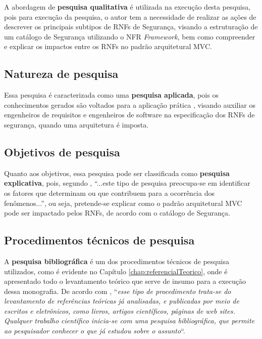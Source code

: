 A abordagem de \textbf{pesquisa qualitativa} é utilizada na execução desta pesquisa, pois para execução da pesquisa, o autor tem a necessidade de realizar as ações de descrever os principais subtipos de RNFs de Segurança, visando a estruturação de um catálogo de Segurança utilizando o NFR \textit{Framework}, bem como compreender e explicar os impactos entre os RNFs no padrão arquitetural MVC. 

\subsection{Natureza de pesquisa}
\label{sub:naturezaDePesquisa}

Essa pesquisa é caracterizada como uma \textbf{pesquisa aplicada}, pois os conhecimentos gerados são voltados para a aplicação prática \cite{gerhardt2009metodos}, visando auxiliar os engenheiros de requisitos e engenheiros de software na especificação dos RNFs de segurança, quando uma arquitetura é imposta. 

\subsection{Objetivos de pesquisa}
\label{sub:objetivosDePesquisa}

Quanto aos objetivos, essa pesquisa pode ser classificada como \textbf{pesquisa explicativa}, pois, segundo \cite{gil2002elaborar}, “...este tipo de pesquisa preocupa-se em identificar os fatores que determinam ou que contribuem para a ocorrência dos fenômenos...”, ou seja, pretende-se explicar como o padrão arquitetural MVC pode ser impactado pelos RNFs, de acordo com o catálogo de Segurança.

\subsection{Procedimentos técnicos de pesquisa}
\label{sub:procedimentosDePesquisa}

A \textbf{pesquisa bibliográfica} é um dos procedimentos técnicos de pesquisa utilizados, como é evidente no Capítulo \ref{chap:referencialTeorico}, onde é apresentado todo o levantamento teórico que serve de insumo para a execução dessa monografia. De acordo com \cite[p.35]{fonseca2002metodologia}, “\textit{esse tipo de procedimento trata-se do levantamento de referências teóricas já analisadas, e publicadas por meio de escritos e eletrônicos, como livros, artigos científicos, páginas de web sites. Qualquer trabalho científico inicia-se com uma pesquisa bibliográfica, que permite ao pesquisador conhecer o que já estudou sobre o assunto}“.
 
